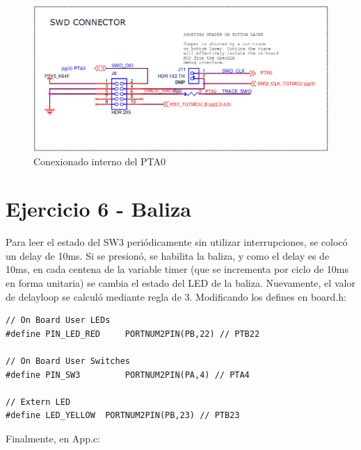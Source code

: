 \documentclass{article}
\begin{document}
\begin{figure}[ht]
	\centering
	\includegraphics[width=0.8 \textwidth]
	{../Imagenes/PTA0.png}
	\caption{Conexionado interno del PTA0}
	\label{fig:ej1}
\end{figure}

\newpage

\section*{Ejercicio 6 - Baliza}

Para leer el estado del SW3 periódicamente sin utilizar interrupciones, se colocó un delay de 10ms. Si se presionó, se habilita la baliza, y como el delay es de 10ms, en cada centena de la variable timer (que se incrementa por ciclo de 10ms en forma unitaria) se cambia el estado del LED de la baliza. Nuevamente, el valor de delayloop se calculó mediante regla de 3.
Modificando los defines en board.h:

\begin{lstlisting}
// On Board User LEDs
#define PIN_LED_RED     PORTNUM2PIN(PB,22) // PTB22

// On Board User Switches
#define PIN_SW3         PORTNUM2PIN(PA,4) // PTA4

// Extern LED
#define LED_YELLOW	PORTNUM2PIN(PB,23) // PTB23
\end{lstlisting}

Finalmente, en App.c:
\end{document}
